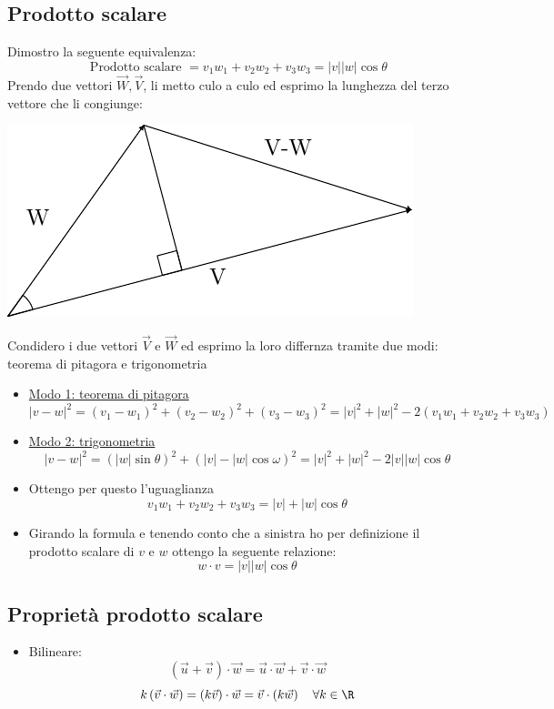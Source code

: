 \subsection{Prodotto scalare}
Dimostro la seguente equivalenza:
\[
	\text{ Prodotto scalare }= v_1 w_1 + v_2 w_2 + v_3w_3 =	\left|v\right|\left|w\right|\cos \theta
\]
Prendo due vettori $ \vec{W}, \vec{V}$, li metto culo a culo ed esprimo la lunghezza del terzo vettore che li congiunge:
\begin{center}
	\includegraphics{Images/Prodotto scalare.pdf}
\end{center}
Condidero i due vettori $ \vec{V} \text{ e } \vec{W}  $ ed esprimo la loro differnza tramite due modi: teorema di pitagora e trigonometria
\begin{itemize}
	\item \underline{Modo 1: teorema di pitagora}
	      \[
		      \left| v-w\right| ^2 = \left( v_1-w_1 \right) ^2 + \left( v_2-w_2 \right) ^2 + \left( v_3-w_3 \right) ^2= \left|v\right|^2 + \left|w\right|^2 - 2\left( v_1w_1 + v_2w_2 + v_3 w_3\right)
	      \]
	\item \underline{Modo 2: trigonometria}
	      \[
		      \left|v-w\right|^2 = \left( \left|w\right| \sin \theta  \right) ^2 + \left( \left|v\right|- \left|w\right| \cos \omega  \right) ^2 = \left|v\right|^2 + \left|w\right|^2 - 2 \left|v\right|\left|w\right|\cos \theta
	      \]
	\item Ottengo per questo l'uguaglianza
	      \[
		      v_1w_1 + v_2w_2 + v_3 w_3 = \left|v\right| + \left|w\right| \cos \theta
	      \]
	\item Girando la formula e tenendo conto che a sinistra ho per definizione il prodotto scalare di $v$ e $w$ ottengo la seguente relazione:
	      \[
		      w \cdot v = \left|v\right|\left|w\right|\cos \theta
	      \]
\end{itemize}
\subsection{Proprietà prodotto scalare}
\begin{itemize}
	\item Bilineare:
	      \[
		      \left( \vec{u} + \vec{v} \right) \cdot \vec{w} = \vec{u} \cdot \vec{w} + \vec{v} \cdot \vec{w}
	      \]
	      \[
		      k\left( \vec{v}\cdot\vec{w} \right) = \left( k\vec{v} \right) \cdot\vec{w} = \vec{v}\cdot \left( k\vec{w} \right) \quad \forall k \in  \R
	      \]
\end{itemize}

